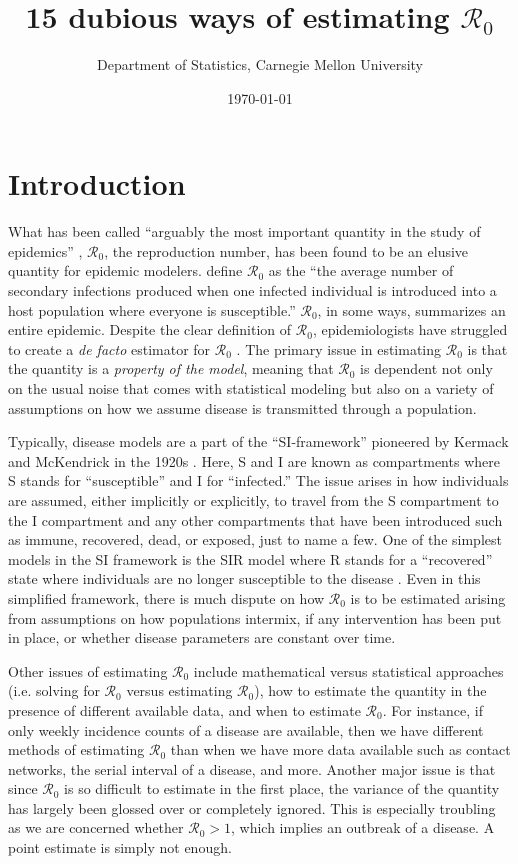 \documentclass[12pt]{article}
\newcommand{\XX}{15 } %
\newcommand{\rr}{\ensuremath{\mathcal{R}_0}}
\begin{document}
\title{\XX dubious ways of estimating $\rr$}
\author{ Department of Statistics, Carnegie Mellon University}
\date{\today}
\maketitle


\section{Introduction}\label{sec:intro}
What has been called ``arguably the most important quantity in the study of epidemics'' \cite{Heesterbeek2002}, $\mathcal{R}_0$, the reproduction number, has been found to be an elusive quantity for epidemic modelers.  \citet{anderson1992} define $\rr$ as the ``the average number of secondary infections produced when one infected individual is introduced into a host population where everyone is susceptible.''  $\rr$, in some ways, summarizes an entire epidemic.  Despite the clear definition of $\rr$, epidemiologists have struggled to create a \textit{de facto} estimator for $\rr$  \citep{hethcote2000}.  The primary issue in estimating $\rr$ is that the quantity is a \textit{property of the model}, meaning that $\rr$ is dependent not only on the usual noise that comes with statistical modeling but also on a variety of assumptions on how we assume disease is transmitted through a population.

Typically, disease models are a part of the ``SI-framework'' pioneered by Kermack and McKendrick in the 1920s \citep{getz2006}.  Here, S and I are known as compartments where S stands for ``susceptible'' and I for ``infected.''  The issue arises in how individuals are assumed, either implicitly or explicitly, to travel from the S compartment to the I compartment and any other compartments that have been introduced such as immune, recovered, dead, or exposed, just to name a few.  One of the simplest models in the SI framework is the SIR model where R stands for a ``recovered'' state where individuals are no longer susceptible to the disease \citep{Kermack700}.  Even in this simplified framework, there is much dispute on how $\rr$ is to be estimated arising from assumptions on how populations intermix, if any intervention has been put in place, or whether disease parameters are constant over time.

Other issues of estimating $\rr$ include mathematical versus statistical approaches (i.e. solving for $\rr$ versus estimating $\rr$), how to estimate the quantity in the presence of different available data, and when to estimate $\rr$.  For instance, if only weekly incidence counts of a disease are available, then we have different methods of estimating $\rr$ than when we have more data available such as contact networks, the serial interval of a disease, and more.  Another major issue is that since $\rr$ is so difficult to estimate in the first place, the variance of the quantity has largely been glossed over or completely ignored.  This is especially troubling as we are concerned whether $\rr > 1$, which implies an outbreak of a disease.  A point estimate is simply not enough.
\end{document}
